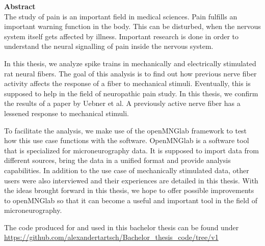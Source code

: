 \vspace*{2cm}

{\bf\Large Abstract} \\ [1em]
The study of pain is an important field in medical sciences. Pain fulfills an important warning function in the body. This can be disturbed, when the nervous system itself gets affected by illness. Important research is done in order to understand the neural signalling of pain inside the nervous system.

In this thesis, we analyze spike trains in mechanically and electrically stimulated rat neural fibers. The goal of this analysis is to find out how previous nerve fiber activity affects the response of a fiber to mechanical stimuli. Eventually, this is supposed to help in the field of neuropathic pain study. In this thesis, we confirm the results of a paper by Uebner et al. A previously active nerve fiber has a lessened response to mechanical stimuli.

To facilitate the analysis, we make use of the openMNGlab framework to test how this use case functions with the software. OpenMNGlab is a software tool that is specialized for microneurography data. It is supposed to import data from different sources, bring the data in a unified format and provide analysis capabilities. In addition to the use case of mechanically stimulated data, other users were also interviewed and their experiences are detailed in this thesis. With the ideas brought forward in this thesis, we hope to offer possible improvements to openMNGlab so that it can become a useful and important tool in the field of microneurography.

The code produced for and used in this bachelor thesis can be found under \url{https://github.com/alexandertartsch/Bachelor_thesis_code/tree/v1}

\cleardoublepage
